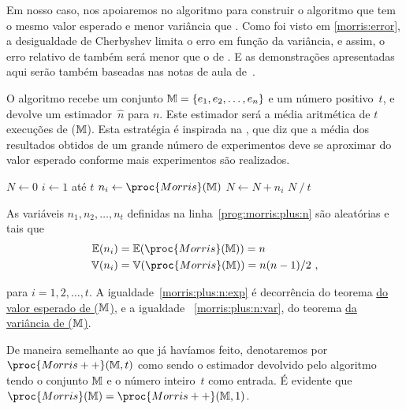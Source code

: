 Em nosso caso, nos apoiaremos no algoritmo  para construir o algoritmo  que tem o mesmo 
valor esperado e menor variância que . Como foi visto em \eqref{morris:error}, a desigualdade de Cherbyshev
limita o erro em função da variância, e assim, o erro relativo de  também será menor que o de 
. E as demonstrações apresentadas aqui serão também baseadas nas notas de aula 
de~\citep{LectureNotesAndoni}.

O algoritmo  recebe um conjunto $\mathbb{M} = \{ e_1, e_2, \dots, e_n \}$ e um número positivo~$t$, e devolve 
um estimador~$\hat{n}$ para $n$. Este estimador será a média aritmética de $t$ execuções de ($\mathbb{M}$). Esta 
estratégia é inspirada na , que diz que a média dos resultados obtidos de um grande número 
de experimentos deve se aproximar do valor esperado conforme mais experimentos são realizados.

\begin{codebox}
  \li $N \gets 0$                       \label{prog:morris:plus:start}                
  \li \For $i \gets 1$ até $t$                             
  \li \Do
      $n_i \gets \proc{Morris}(\Mbb)$   \label{prog:morris:plus:n}
  \li $N \gets N + n_i$
      \End
  \li
  \Return $N \mathbin{/} t$
  \End
\end{codebox}

As variáveis $n_1, n_2, \dots, n_t$ definidas na linha~\ref{prog:morris:plus:n} são aleatórias e tais que
\begin{align}
  \Ebb(n_i) &= \Ebb(\proc{Morris}(\Mbb)) = n                \label{morris:plus:n:exp} \\     
  \Vbb(n_i) &= \Vbb(\proc{Morris}(\Mbb)) = n(n - 1)/2 \ ,   \label{morris:plus:n:var}
\end{align}

para $i = 1, 2, \dots, t$. A igualdade~\eqref{morris:plus:n:exp} é decorrência do teorema 
\hyperref[morris:theorem:expected_value]{do valor esperado de ($\mathbb{M}$)}, e a igualdade~
\eqref{morris:plus:n:var}, do teorema \hyperref[morris:theorem:variance]{da variância de ($\mathbb{M}$)}.

De maneira semelhante ao que já havíamos feito, denotaremos por $\proc{Morris++}(\Mbb, t)$ como sendo o estimador 
devolvido pelo algoritmo tendo o conjunto $\mathbb{M}$ e o número inteiro~$t$ como entrada. É evidente que 
$\proc{Morris}(\Mbb) = \proc{Morris++}(\Mbb, 1)$.

